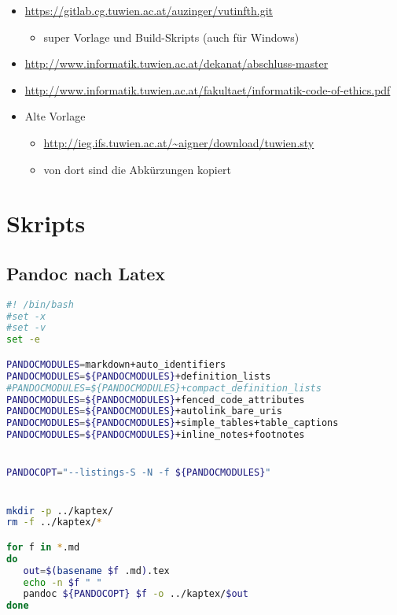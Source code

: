 \begin{itemize}
\tightlist
\item
  \url{https://gitlab.cg.tuwien.ac.at/auzinger/vutinfth.git}

  \begin{itemize}
  \tightlist
  \item
    super Vorlage und Build-Skripts (auch für Windows)
  \end{itemize}
\item
  \url{http://www.informatik.tuwien.ac.at/dekanat/abschluss-master}
\item
  \url{http://www.informatik.tuwien.ac.at/fakultaet/informatik-code-of-ethics.pdf}
\item
  Alte Vorlage

  \begin{itemize}
  \tightlist
  \item
    \url{http://ieg.ifs.tuwien.ac.at/~aigner/download/tuwien.sty}
  \item
    von dort sind die Abkürzungen kopiert
  \end{itemize}
\end{itemize}

\section{Skripts}\label{skripts}

\subsection{Pandoc nach Latex}\label{pandoc-nach-latex}

\begin{lstlisting}[language=bash]
#! /bin/bash
#set -x
#set -v
set -e

PANDOCMODULES=markdown+auto_identifiers
PANDOCMODULES=${PANDOCMODULES}+definition_lists
#PANDOCMODULES=${PANDOCMODULES}+compact_definition_lists
PANDOCMODULES=${PANDOCMODULES}+fenced_code_attributes
PANDOCMODULES=${PANDOCMODULES}+autolink_bare_uris
PANDOCMODULES=${PANDOCMODULES}+simple_tables+table_captions
PANDOCMODULES=${PANDOCMODULES}+inline_notes+footnotes


PANDOCOPT="--listings-S -N -f ${PANDOCMODULES}"


mkdir -p ../kaptex/
rm -f ../kaptex/*

for f in *.md
do
   out=$(basename $f .md).tex
   echo -n $f " "
   pandoc ${PANDOCOPT} $f -o ../kaptex/$out
done
\end{lstlisting}

